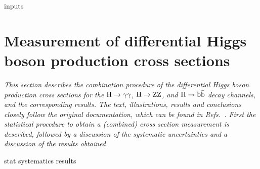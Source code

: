 {inputs}

\section{Measurement of differential Higgs boson production cross sections}
\label{sec:diffxs}

\emph{%
This section describes the combination procedure of the differential Higgs boson production cross sections for the $\mathrm{H}\to\mathrm{\gamma}\mathrm{\gamma}$, $\mathrm{H}\to\mathrm{Z}\mathrm{Z}$, and $\mathrm{H}\to\mathrm{b}\bar{\mathrm{b}}$ decay channels, and the corresponding results. The text, illustrations, results and conclusions closely follow the original documentation, which can be found in Refs.~\cite{AN-17-244,HIG-17-028}. First the statistical procedure to obtain a (combined) cross section measurement is described, followed by a discussion of the systematic uncertainties and a discussion of the results obtained.
}

{stat}
{systematics}
{results}
